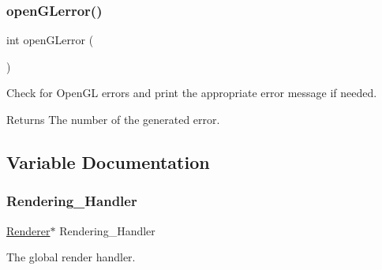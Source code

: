 \subsubsection{\texorpdfstring{open\+G\+Lerror()}{openGLerror()}}
{\footnotesize\ttfamily int open\+G\+Lerror (\begin{DoxyParamCaption}{ }\end{DoxyParamCaption})}

Check for Open\+GL errors and print the appropriate error message if needed.

\begin{DoxyReturn}{Returns}
The number of the generated error. 
\end{DoxyReturn}


\subsection{Variable Documentation}
\mbox{\label{OpenGL-Wrappers_8hpp_a21679bfe3ff6515d046879b080ac8ca9}} 
\subsubsection{\texorpdfstring{Rendering\+\_\+\+Handler}{Rendering\_Handler}}
{\footnotesize\ttfamily \mbox{\hyperlink{classRenderer}{Renderer}}$\ast$ Rendering\+\_\+\+Handler}



The global render handler. 

